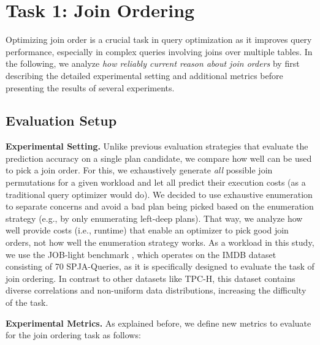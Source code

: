 \section{Task 1: Join Ordering} \label{sec:join_order}

Optimizing join order is a crucial task in query optimization as it improves query performance, especially in complex queries involving joins over multiple tables.
In the following, we analyze \emph{how reliably current \lcms reason about join orders} by first describing the detailed experimental setting and additional metrics before presenting the results of several experiments.
\subsection{Evaluation Setup}\label{subsec:join_order_setup}
\noindent\textbf{Experimental Setting.}
Unlike previous evaluation strategies that evaluate the prediction accuracy on a single plan candidate, we compare how well \lcms can be used to pick a join order.
For this, we exhaustively generate \textit{all} possible join permutations for a given workload and let all \lcms predict their execution costs (as a traditional query optimizer would do).
We decided to use exhaustive enumeration to separate concerns and avoid a bad plan being picked based on the enumeration strategy (e.g., by only enumerating left-deep plans).
That way, we analyze how well \lcms provide costs (i.e., runtime) that enable an optimizer to pick good join orders, not how well the enumeration strategy works.
As a workload in this study, we use the JOB-light benchmark \cite{leis_how_2015, kipf2019}, which operates on the IMDB dataset consisting of 70 SPJA-Queries, as it is specifically designed to evaluate the task of join ordering.
In contrast to other datasets like TPC-H, this dataset contains diverse correlations and non-uniform data distributions, increasing the difficulty of the task.

\noindent\textbf{Experimental Metrics.}
As explained before, we define new metrics to evaluate \lcms for the join ordering task as follows:

